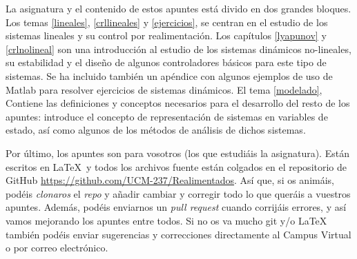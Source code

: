 La asignatura y el contenido de estos apuntes está divido en dos grandes bloques. Los temas \ref{lineales}, \ref{crllineales} y \ref{ejercicios}, se centran en el estudio de los sistemas lineales y su control por realimentación.   Los capítulos \ref{lyapunov} y \ref{crlnolineal} son una introducción al estudio de los sistemas dinámicos no-lineales, su estabilidad y el diseño de algunos controladores básicos para este tipo de sistemas. Se ha incluido también un apéndice con algunos ejemplos de uso de Matlab para resolver ejercicios de sistemas dinámicos. El tema \ref{modelado}, Contiene las definiciones y conceptos necesarios para el desarrollo del resto de los apuntes: introduce el concepto de representación de sistemas en variables de estado, así como algunos de los métodos de análisis de dichos sistemas. 

Por último, los apuntes son para vosotros (los que estudiáis la asignatura). Están escritos en \LaTeX\ y todos los archivos fuente están colgados en el repositorio de GitHub \url{https://github.com/UCM-237/Realimentados}. Así que, si os animáis, podéis \emph{clonaros} el \emph{repo} y añadir cambiar y corregir todo lo que queráis a vuestros apuntes. Además, podéis enviarnos un \emph{pull request} cuando corrijáis errores, y así vamos mejorando los apuntes entre todos. Si no os va mucho git y/o \LaTeX\, también podéis enviar sugerencias y correcciones directamente al Campus Virtual o por correo electrónico.


